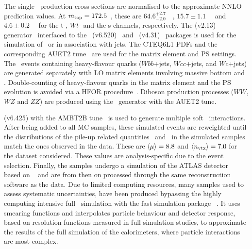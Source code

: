 The single \tquark\ production cross sections are normalised to the approximate \gls{NNLO} prediction values. 
%
At $m_{\mathrm{top}}=172.5$~\GeV, these are $64.6^{+2.7}_{-2.0}$~\pb~\cite{Kidonakis:2011wy}, $15.7\pm 1.1$~\pb~\cite{Kidonakis:2010ux} and $4.6\pm 0.2$~\pb~\cite{Kidonakis:2010tc} for the t-, $Wt$- and the s-channels, respectively. 
%
%
The \Alpgen (v2.13) generator~\cite{MAN-0301} interfaced to the \Herwig\ (v6.520)~\cite{COR-0001} and \Jimmy\ (v4.31)~\cite{SAMPLES-JIMMY} packages is used for the simulation of \Wbos\ or  in association with jets. 
%
The CTEQ6L1 \glspl{PDF} and the corresponding AUET2 tune~\cite{ATL-PHYS-PUB-2011-008} are used for the matrix element and \gls{PS} settings. 
%
The \Wj\ events containing heavy-flavour quarks ($Wbb$+jets, $Wcc$+jets, and $Wc$+jets) are generated separately with \gls{LO} matrix elements involving massive bottom and . 
%
Double-counting of heavy-flavour quarks in the matrix element and the \gls{PS} evolution is avoided via a \gls{HFOR} procedure~\cite{TwikiHFOR}. 
%
Diboson production processes ($WW$, $WZ$ and $ZZ$) are produced using the \Herwig\ generator with the AUET2 tune.



\Pythia (v6.425) with the AMBT2B tune~\cite{ATL-PHYS-PUB-2011-009} is used to generate multiple soft \pp\ interactions. 
%
After being added to all \gls{MC} samples, these simulated events are reweighted until the distributions of the pile-up related quantities \meanmu\ and \nvtx\ in the simulated samples match the ones observed in the data. 
%
These are $\langle\mu\rangle=8.8$ and $\langle n_\mathrm{vtx}\rangle=7.0$ for the dataset considered. These values are analysis-specific due to the event selection.
%
Finally, the samples undergo a simulation of the ATLAS detector~\cite{WT-ATLAS-SIMULATION-PAPER} based on \Geantfour~\cite{AGO-0301} and are from then on processed through the same reconstruction software as the data. Due to limited computing resources, many samples used to assess systematic uncertainties, have been produced bypassing the highly computing intensive full \Geantfour\ simulation with the fast simulation package \Atlfast~\cite{Richter-Was:683751}. It uses smearing functions and interpolates particle behaviour and detector response, based on resolution functions measured in full simulation studies, to approximate the results of the full simulation of the calorimeters, where particle interactions are most complex. 









